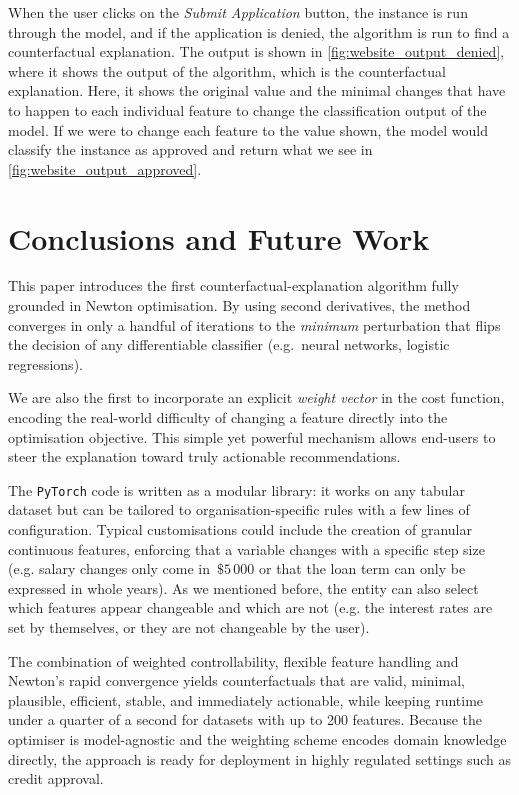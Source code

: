 \documentclass[12pt]{extarticle}
\numberwithin{equation}{section}
\begin{document}
When the user clicks on the \emph{Submit Application} button, the instance is run through the model, and if the application is denied, the algorithm is run to find a counterfactual explanation. The output is shown in \autoref{fig:website_output_denied}, where it shows the output of the algorithm, which is the counterfactual explanation. Here, it shows the original value and the minimal changes that have to happen to each individual feature to change the classification output of the model. If we were to change each feature to the value shown, the model would classify the instance as approved and return what we see in \autoref{fig:website_output_approved}.


\section{Conclusions and Future Work}\label{sec:conclusion}

This paper introduces the first counterfactual-explanation algorithm fully grounded in Newton optimisation.  
By using second derivatives, the method converges in only a handful of iterations to the \emph{minimum} perturbation that flips the decision of any differentiable classifier (e.g.\ neural networks, logistic regressions).  

We are also the first to incorporate an explicit \emph{weight vector} in the cost function, encoding the real-world difficulty of changing a feature directly into the optimisation objective. This simple yet powerful mechanism allows end-users to steer the explanation toward truly actionable recommendations.

The \texttt{PyTorch} code is written as a modular library: it works on any tabular dataset but can be tailored to organisation-specific rules with a few lines of configuration. Typical customisations could include the creation of granular continuous features, enforcing that a variable changes with a specific step size (e.g. salary changes only come in \(\,\$5\,000\) or that the loan term can only be expressed in whole years). As we mentioned before, the entity can also select which features appear changeable and which are not (e.g. the interest rates are set by themselves, or they are not changeable by the user).

The combination of weighted controllability, flexible feature handling and Newton's rapid convergence yields counterfactuals that are valid, minimal, plausible, efficient, stable, and immediately actionable, while keeping runtime under a quarter of a second for datasets with up to 200 features. Because the optimiser is model-agnostic and the weighting scheme encodes domain knowledge directly, the approach is ready for deployment in highly regulated settings such as credit approval.
\end{document}
